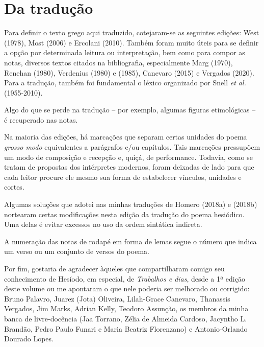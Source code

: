 \section{Da tradução}

Para definir o texto grego aqui traduzido, cotejaram-se as seguintes
edições: West (1978), Most (2006) e Ercolani (2010). Também foram muito
úteis para se definir a opção por determinada leitura ou interpretação,
bem como para compor as notas, diversos textos citados na bibliografia,
especialmente Marg (1970), Renehan (1980), Verdenius (1980) e (1985),
Canevaro (2015) e Vergados (2020). Para a tradução, também foi
fundamental o léxico organizado por Snell \emph{et al.} (1955-2010).

Algo do que se perde na tradução -- por exemplo, algumas figuras
etimológicas -- é recuperado nas notas.

Na maioria das edições, há marcações que separam certas unidades do
poema \emph{grosso modo} equivalentes a parágrafos e/ou capítulos. Tais
marcações pressupõem um modo de composição e recepção e, quiçá, de
performance. Todavia, como se tratam de propostas dos intérpretes
modernos, foram deixadas de lado para que cada leitor procure ele mesmo
sua forma de estabelecer vínculos, unidades e cortes.

Algumas soluções que adotei nas minhas traduções de Homero (2018a) e
(2018b) nortearam certas modificações nesta edição da tradução do poema
hesiódico. Uma delas é evitar excessos no uso da ordem sintática
indireta.

A numeração das notas de rodapé em forma de lemas segue o número que
indica um verso ou um conjunto de versos do poema.

Por fim, gostaria de agradecer àqueles que compartilharam comigo seu
conhecimento de Hesíodo, em especial, de \emph{Trabalhos e dias}, desde
a 1ª edição deste volume ou me apontaram o que nele poderia ser
melhorado ou corrigido: Bruno Palavro, Juarez (Jota) Oliveira,
Lilah-Grace Canevaro, Thanassis Vergados, Jim Marks, Adrian Kelly,
Teodoro Assunção, os membros da minha banca de livre-docência (Jaa
Torrano, Zélia de Almeida Cardoso, Jacyntho L. Brandão, Pedro Paulo
Funari e Maria Beatriz Florenzano) e Antonio-Orlando Dourado Lopes.


